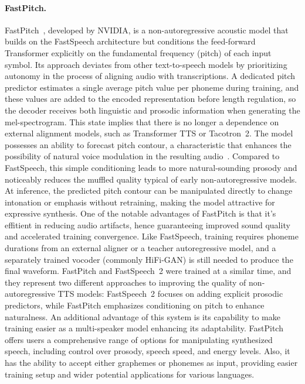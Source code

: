 \documentclass[
         english, %
    monochrome, %
]{VUMIFSEMasterThesis}
\begin{document}
\paragraph{FastPitch.}
FastPitch~\cite{lancucki2021fastpitch}, developed by NVIDIA, is a non-autoregressive acoustic model that builds on the FastSpeech architecture but conditions the feed-forward Transformer explicitly on the fundamental frequency (pitch) of each input symbol.
Its approach deviates from other text-to-speech models by prioritizing autonomy in the process of aligning audio with transcriptions.
A dedicated pitch predictor estimates a single average pitch value per phoneme during training, and these values are added to the encoded representation before length regulation, so the decoder receives both linguistic and prosodic information when generating the mel-spectrogram.
This state implies that there is no longer a dependence on external alignment models, such as Transformer TTS or Tacotron~2.
The model possesses an ability to forecast pitch contour, a characteristic that enhances the possibility of natural voice modulation in the resulting audio~\cite{liu2023comparative}.
Compared to FastSpeech, this simple conditioning leads to more natural-sounding prosody and noticeably reduces the muffled quality typical of early non-autoregressive models.
At inference, the predicted pitch contour can be manipulated directly to change intonation or emphasis without retraining, making the model attractive for expressive synthesis.
One of the notable advantages of FastPitch is that it's effitient in reducing audio artifacts, hence guaranteeing improved sound quality and accelerated training convergence.
Like FastSpeech, training requires phoneme durations from an external aligner or a teacher autoregressive model, and a separately trained vocoder (commonly HiFi-GAN) is still needed to produce the final waveform.
FastPitch and FastSpeech~2 were trained at a similar time, and they represent two different approaches to improving the quality of non-autoregressive TTS models: FastSpeech~2 focuses on adding explicit prosodic predictors, while FastPitch emphasizes conditioning on pitch to enhance naturalness.
An additional advantage of this system is its capability to make training easier as a multi-speaker model enhancing its adaptability.
FastPitch offers users a comprehensive range of options for manipulating synthesized speech, including control over prosody, speech speed, and energy levels.
Also, it has the ability to accept either graphemes or phonemes as input, providing easier training setup and wider potential applications for various languages.
\end{document}
